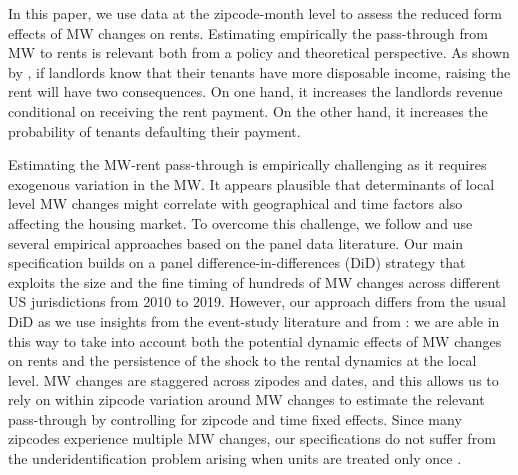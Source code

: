 In this paper, we use data at the zipcode-month level to assess the reduced form effects of 
MW changes on rents. Estimating empirically the pass-through from MW to rents is relevant both 
from a policy and theoretical perspective. As shown by \textcite{agarwal2019minimum}, if landlords 
know that their tenants have more disposable income, raising the rent will have two consequences. 
On one hand, it increases the landlords revenue conditional on receiving the rent payment. On the 
other hand, it increases the probability of tenants defaulting their payment.

Estimating the MW-rent pass-through is empirically challenging as it requires exogenous variation 
in the MW. It appears plausible that determinants of local level MW changes might correlate with 
geographical and time factors also affecting the housing market. To overcome this challenge, we 
follow \textcite{meer2016effects} and use several empirical approaches based on the panel data 
literature. Our main specification builds on a panel difference-in-differences (DiD) strategy 
that exploits the size and the fine timing of hundreds of MW changes across different US jurisdictions 
from 2010 to 2019. However, our approach differs from the usual DiD as we use insights from the 
event-study literature and from \textcite{arellano1991some}: we are able in this way to take into 
account both the potential dynamic effects of MW changes on rents and the persistence of the shock 
to the rental dynamics at the local level. MW changes are staggered across zipodes and dates, and 
this allows us to rely on within zipcode variation around MW changes to estimate the relevant 
pass-through by controlling for zipcode and time fixed effects. Since many zipcodes experience 
multiple MW changes, our specifications do not suffer from the underidentification problem arising 
when units are treated only once \parencite{BorusyakJaravel2017}.

